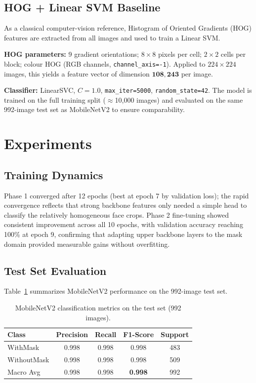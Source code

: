 \documentclass[11pt,a4paper]{article}
\begin{document}
\subsection{HOG + Linear SVM Baseline}

As a classical computer-vision reference, Histogram of Oriented Gradients (HOG)
features \cite{dalal2005} are extracted from all images and used to train a
Linear SVM.

\textbf{HOG parameters:} 9 gradient orientations; $8{\times}8$ pixels per cell;
$2{\times}2$ cells per block; colour HOG (RGB channels, \texttt{channel\_axis=-1}).
Applied to $224{\times}224$ images, this yields a feature vector of dimension
$\mathbf{108{,}243}$ per image.

\textbf{Classifier:} LinearSVC, $C = 1.0$, \texttt{max\_iter=5000},
\texttt{random\_state=42}.
The model is trained on the full training split ($\approx$10,000 images) and
evaluated on the same 992-image test set as MobileNetV2 to ensure comparability.

\section{Experiments}

\subsection{Training Dynamics}

Phase 1 converged after 12 epochs (best at epoch 7 by validation loss); the rapid
convergence reflects that strong backbone features only needed a simple head to
classify the relatively homogeneous face crops.
Phase 2 fine-tuning showed consistent improvement across all 10 epochs, with
validation accuracy reaching 100\% at epoch 9, confirming that adapting upper
backbone layers to the mask domain provided measurable gains without overfitting.

\subsection{Test Set Evaluation}

Table~\ref{tab:mobilenet} summarizes MobileNetV2 performance on the 992-image test
set.

\begin{table}[H]
\centering
\caption{MobileNetV2 classification metrics on the test set (992 images).}
\label{tab:mobilenet}
\begin{tabular}{lcccc}
\toprule
Class & Precision & Recall & F1-Score & Support \\
\midrule
WithMask    & 0.998 & 0.998 & 0.998 & 483 \\
WithoutMask & 0.998 & 0.998 & 0.998 & 509 \\
\midrule
Macro Avg   & 0.998 & 0.998 & \textbf{0.998} & 992 \\
\bottomrule
\end{tabular}
\end{table}
\end{document}
